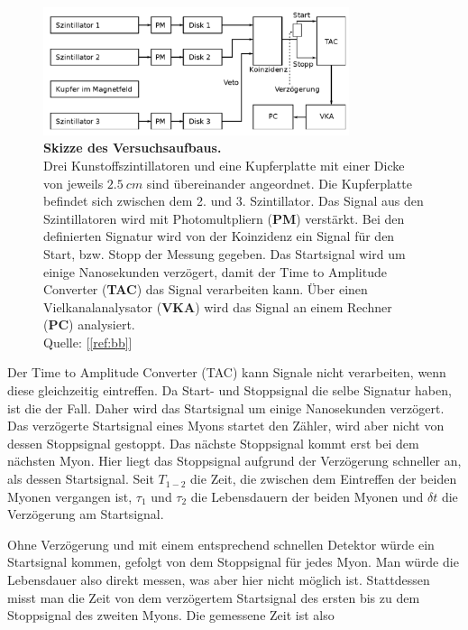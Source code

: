 \documentclass[a4paper,ngerman]{scrartcl}
\begin{document}
\begin{figure}[tb!]
  \centering
  \includegraphics[width=0.8\textwidth]{abbildungen/aufbau_skizze.png}
  \caption{\textbf{Skizze des Versuchsaufbaus.} 
  \\ 
  Drei Kunstoffszintillatoren und eine Kupferplatte mit einer Dicke von jeweils $\SI{2.5}{cm}$ sind übereinander angeordnet. Die Kupferplatte befindet sich zwischen dem 2. und 3. Szintillator. Das Signal aus den Szintillatoren wird mit Photomultpliern (\textbf{PM}) verstärkt. Bei den definierten Signatur wird von der Koinzidenz ein Signal für den Start, bzw. Stopp der Messung gegeben. Das Startsignal wird um einige Nanosekunden verzögert, damit der Time to Amplitude Converter (\textbf{TAC}) das Signal verarbeiten kann. Über einen Vielkanalanalysator (\textbf{VKA}) wird das Signal an einem Rechner (\textbf{PC}) analysiert.
  \\Quelle: [\ref{ref:bb}]}
  \label{fig:aufbau_skizze}
\end{figure}

Der Time to Amplitude Converter (TAC) kann Signale nicht verarbeiten, wenn diese gleichzeitig eintreffen. Da Start- und Stoppsignal die selbe Signatur haben, ist die der Fall. 
Daher wird das Startsignal um einige Nanosekunden verzögert. 
Das verzögerte Startsignal eines Myons startet den Zähler, wird aber nicht von dessen Stoppsignal gestoppt. Das nächste Stoppsignal kommt erst bei dem nächsten Myon. Hier liegt das Stoppsignal aufgrund der Verzögerung schneller an, als dessen Startsignal. Seit $T_{1-2}$ die Zeit, die zwischen dem Eintreffen der beiden Myonen vergangen ist, $\tau_1$ und $\tau_2$ die Lebensdauern der beiden Myonen und $\delta t$ die Verzögerung am Startsignal. 

Ohne Verzögerung und mit einem entsprechend schnellen Detektor würde ein Startsignal kommen, gefolgt von dem Stoppsignal für jedes Myon. Man würde die Lebensdauer also direkt messen, was aber hier nicht möglich ist. Stattdessen misst man die Zeit von dem verzögertem Startsignal des ersten bis zu dem Stoppsignal des zweiten Myons. Die gemessene Zeit ist also
\end{document}
